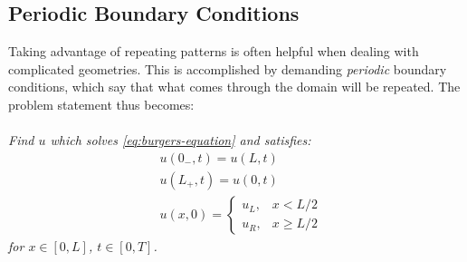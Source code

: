 \subsection{Periodic Boundary Conditions}\label{subsec:periodic}
Taking advantage of repeating patterns is often helpful when dealing with complicated geometries.
This is accomplished by demanding \textit{periodic} boundary conditions, which say that what comes through the domain will be repeated.
The problem statement thus becomes:\\~\\

\noindent
\textit{Find $u$ which solves \cref{eq:burgers-equation} and satisfies:
    \begin{equation}
        \label{eq:periodic-problem-statement}
        \begin{split}
            &u(0_-,t)=u(L,t)\\
            &u(L_+,t)=u(0,t)\\
            &u(x,0)=\begin{cases}
                        u_L, & x<L/2\\
                        u_R, & x\geq L/2
            \end{cases}
        \end{split}
    \end{equation}
    for $x\in [0,L]$, $t\in[0,T]$.}

